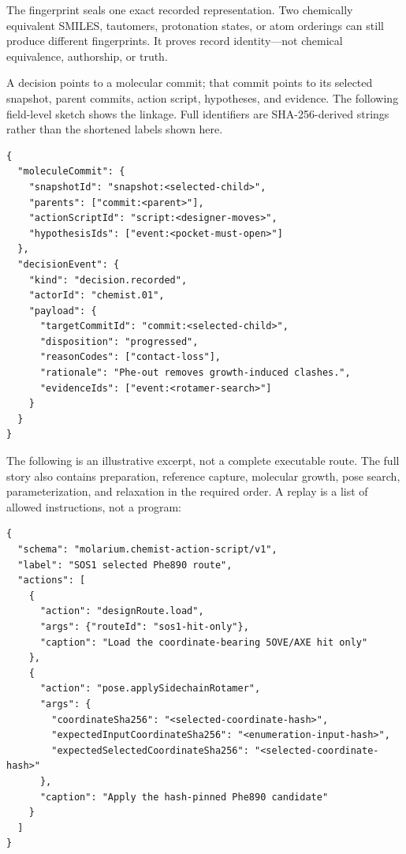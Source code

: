 The fingerprint seals one exact recorded representation. Two chemically
equivalent SMILES, tautomers, protonation states, or atom orderings can still
produce different fingerprints. It proves record identity---not chemical
equivalence, authorship, or truth.

A decision points to a molecular commit; that commit points to its selected
snapshot, parent commits, action script, hypotheses, and evidence. The following
field-level sketch shows the linkage. Full identifiers are SHA-256-derived
strings rather than the shortened labels shown here.

\noindent\begin{minipage}{\linewidth}
\small
\begin{verbatim}
{
  "moleculeCommit": {
    "snapshotId": "snapshot:<selected-child>",
    "parents": ["commit:<parent>"],
    "actionScriptId": "script:<designer-moves>",
    "hypothesisIds": ["event:<pocket-must-open>"]
  },
  "decisionEvent": {
    "kind": "decision.recorded",
    "actorId": "chemist.01",
    "payload": {
      "targetCommitId": "commit:<selected-child>",
      "disposition": "progressed",
      "reasonCodes": ["contact-loss"],
      "rationale": "Phe-out removes growth-induced clashes.",
      "evidenceIds": ["event:<rotamer-search>"]
    }
  }
}
\end{verbatim}
\end{minipage}

The following is an illustrative excerpt, not a complete executable route. The
full story also contains preparation, reference capture, molecular growth, pose
search, parameterization, and relaxation in the required order. A replay is a
list of allowed instructions, not a program:

\noindent\begin{minipage}{\linewidth}
\small
\begin{verbatim}
{
  "schema": "molarium.chemist-action-script/v1",
  "label": "SOS1 selected Phe890 route",
  "actions": [
    {
      "action": "designRoute.load",
      "args": {"routeId": "sos1-hit-only"},
      "caption": "Load the coordinate-bearing 5OVE/AXE hit only"
    },
    {
      "action": "pose.applySidechainRotamer",
      "args": {
        "coordinateSha256": "<selected-coordinate-hash>",
        "expectedInputCoordinateSha256": "<enumeration-input-hash>",
        "expectedSelectedCoordinateSha256": "<selected-coordinate-hash>"
      },
      "caption": "Apply the hash-pinned Phe890 candidate"
    }
  ]
}
\end{verbatim}
\end{minipage}

